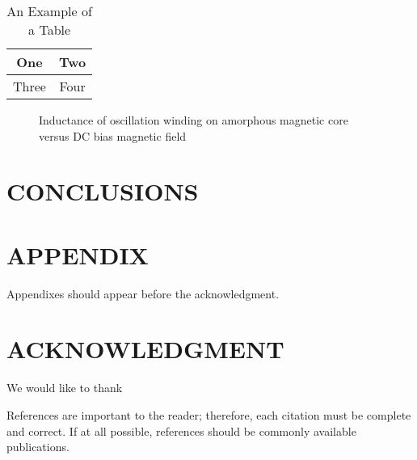 \documentclass[letterpaper, 10 pt, conference]{ieeeconf}  %
\theoremstyle{prop}
\begin{document}
\begin{table}[h]
\caption{An Example of a Table}
\label{table_example}
\begin{center}
\begin{tabular}{|c||c|}
\hline
One & Two\\
\hline
Three & Four\\
\hline
\end{tabular}
\end{center}
\end{table}


   \begin{figure}[thpb]
      \centering
      \caption{Inductance of oscillation winding on amorphous
       magnetic core versus DC bias magnetic field}
      \label{figurelabel}
   \end{figure}


\section{CONCLUSIONS}


\addtolength{\textheight}{-12cm}   %







\section*{APPENDIX}

Appendixes should appear before the acknowledgment.

\section*{ACKNOWLEDGMENT}

We would like to thank

\balance



References are important to the reader; therefore, each citation must be complete and correct. If at all possible, references should be commonly available publications.
\end{document}
